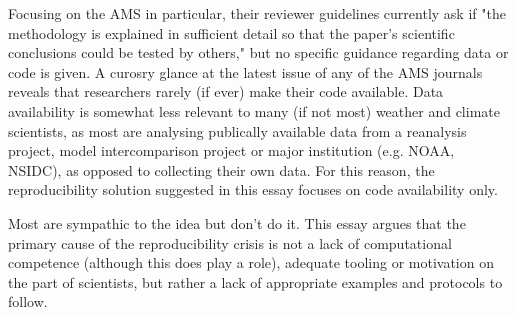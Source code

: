 Focusing on the AMS in particular, their reviewer guidelines currently ask if "the methodology is explained in sufficient detail so that the paper's scientific conclusions could be tested by others," but no specific guidance regarding data or code is given. A curosry glance at the latest issue of any of the AMS journals reveals that researchers rarely (if ever) make their code available. Data availability is somewhat less relevant to many (if not most) weather and climate scientists, as most are analysing publically available data from a reanalysis project, model intercomparison project or major institution (e.g. NOAA, NSIDC), as opposed to collecting their own data. For this reason, the reproducibility solution suggested in this essay focuses on code availability only.


Most are sympathic to the idea but don't do it. This essay argues that the primary cause of the reproducibility crisis is not a lack of computational competence (although this does play a role), adequate tooling or motivation on the part of scientists, but rather a lack of appropriate examples and protocols to follow.




